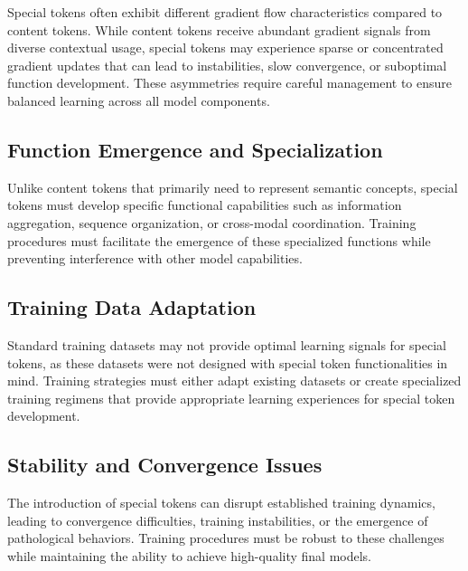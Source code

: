 Special tokens often exhibit different gradient flow characteristics compared to content tokens. While content tokens receive abundant gradient signals from diverse contextual usage, special tokens may experience sparse or concentrated gradient updates that can lead to instabilities, slow convergence, or suboptimal function development. These asymmetries require careful management to ensure balanced learning across all model components.
\begin{comment}
Feedback: A concrete example would make this much clearer. For instance: "Consider an [EOS] token. It only appears once per sequence, at the very end. This means it receives a gradient signal far less frequently than a common word like 'the'. This sparsity can cause its embedding to learn very slowly. Training strategies must account for this, for example by using a higher learning rate for the special token embeddings or by weighting the loss on that position more heavily."
\end{comment}

\subsection{Function Emergence and Specialization}

Unlike content tokens that primarily need to represent semantic concepts, special tokens must develop specific functional capabilities such as information aggregation, sequence organization, or cross-modal coordination. Training procedures must facilitate the emergence of these specialized functions while preventing interference with other model capabilities.

\subsection{Training Data Adaptation}

Standard training datasets may not provide optimal learning signals for special tokens, as these datasets were not designed with special token functionalities in mind. Training strategies must either adapt existing datasets or create specialized training regimens that provide appropriate learning experiences for special token development.

\subsection{Stability and Convergence Issues}

The introduction of special tokens can disrupt established training dynamics, leading to convergence difficulties, training instabilities, or the emergence of pathological behaviors. Training procedures must be robust to these challenges while maintaining the ability to achieve high-quality final models.

